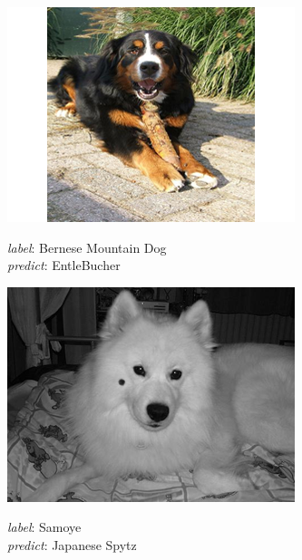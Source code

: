 \documentclass{article}
\begin{document}
\begin{figure}
	\centering
	\label{fig:failures}
	\begin{subfigure}{0.32\linewidth}
		\centering
		\includegraphics[width=\linewidth]{pics/f1}
		\caption{ }
		\emph{label}: Bernese Mountain Dog \\ \emph{predict}: EntleBucher
		\label{fig:f1}
	\end{subfigure}
	\begin{subfigure}{0.32\linewidth}
		\centering
		\includegraphics[width=\linewidth]{pics/d1}
		\caption{ }
		\emph{label}: Samoye \\ \emph{predict}: Japanese Spytz
		\label{fig:d1}
	\end{subfigure}  
	\begin{subfigure}{0.32\linewidth}

\end{subfigure}
\end{figure}
\end{document}
